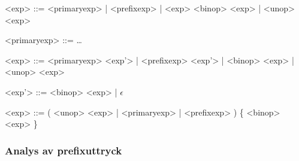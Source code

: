 \begin{description}
  \setlength{\grammarindent}{5em}
  \item[Ursprungsregel] \hfill
    \begin{grammar}
      \singlespace\small%
      \selectfont
      <exp> ::= <primaryexp> | <prefixexp> | <exp> <binop> <exp> | <unop> <exp>

      <primaryexp> ::= \ldots
    \end{grammar}

  \item[Eliminering av vänsterrekursion] \hfill
    \begin{grammar}
      \singlespace\small%
      \selectfont
      <exp> ::= <primaryexp> <exp'> | <prefixexp> <exp'> | <binop> <exp> | <unop> <exp>

      <exp'> ::= <binop> <exp> | $\epsilon$
    \end{grammar}

  \item[Resultat] \hfill
    \begin{grammar}
      \singlespace\small%
      \selectfont
      <exp> ::= ( <unop> <exp> | <primaryexp> | <prefixexp> ) \{ <binop> <exp> \}
    \end{grammar}
\end{description}

\subsubsection{Analys av prefixuttryck}


